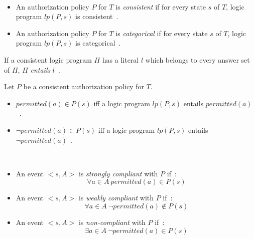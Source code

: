 \begin{definition}
    \label{def:authorization_consistent}
    \label{def:authorization_categorical}
    ~

    \begin{itemize}
        \item An authorization policy $P$ for $T$ is \textit{consistent} if for every state $s$ of $T$, logic program $lp(P, s)$ is consistent~\citep{gelfond_authorization_2008}.
        \item An authorization policy $P$ for $T$ is \textit{categorical} if for every state $s$ of $T$, logic program $lp(P, s)$ is categorical~\citep{gelfond_authorization_2008}.
    \end{itemize}
\end{definition}

\begin{definition}
    \label{def:entails}
    If a consistent logic program $\Pi$ has a literal $l$ which belongs to every answer set of $\Pi$, $\Pi$ \textit{entails} $l$~\citep{gelfond_authorization_2008}.
\end{definition}

\begin{definition}
    Let $P$ be a consistent authorization policy for $T$.

    \begin{itemize}
        \item $permitted(a) \in P(s)$ iff a logic program $lp(P, s)$ entails $permitted(a)$~\citep{gelfond_authorization_2008}.
        \item $\neg permitted(a) \in P(s)$ iff a logic program $lp(P, s)$ entails $\neg permitted(a)$~\citep{gelfond_authorization_2008}.
    \end{itemize}
\end{definition}

\begin{definition}
    \label{def:authorization_event_compliance}
    ~

    \begin{itemize}
        \item An event $<s, A>$ is \textit{strongly compliant} with $P$ if~\citep{gelfond_authorization_2008}:
            \[
                \forall a \in A\ permitted(a) \in P(s)
            \]
        \item An event $<s, A>$ is \textit{weakly compliant} with $P$ if~\citep{gelfond_authorization_2008}:
            \[
                \forall a \in A\ \neg permitted(a) \not \in P(s)
            \]
        \item An event $<s, A>$ is \textit{non-compliant} with $P$ if~\citep{gelfond_authorization_2008}:
            \[
                \exists a \in A\ \neg permitted(a) \in P(s)
            \]
    \end{itemize}
\end{definition}

